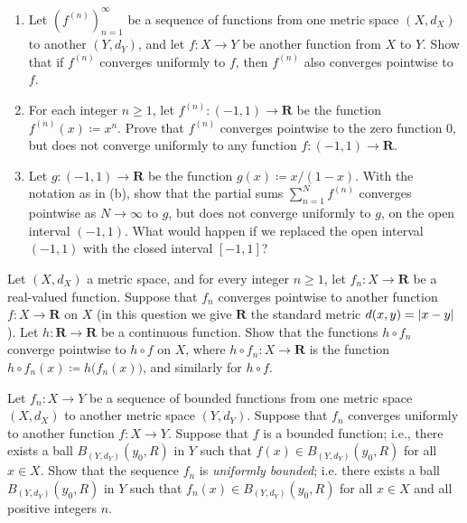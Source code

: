 \begin{exercise}\label{ex 3.2.2}
    \quad
    \begin{enumerate}
        \item Let \((f^{(n)})_{n = 1}^\infty\) be a sequence of functions from one metric space \((X, d_X)\) to another \((Y, d_Y)\), and let \(f : X \to Y\) be another function from \(X\) to \(Y\).
              Show that if \(f^{(n)}\) converges uniformly to \(f\), then \(f^{(n)}\) also converges pointwise to \(f\).
        \item For each integer \(n \geq 1\), let \(f^{(n)} : (-1, 1) \to \mathbf{R}\) be the function \(f^{(n)}(x) \coloneqq x^n\).
              Prove that \(f^{(n)}\) converges pointwise to the zero function \(0\), but does not converge uniformly to any function \(f : (-1, 1) \to \mathbf{R}\).
        \item Let \(g : (-1, 1) \to \mathbf{R}\) be the function \(g(x) \coloneqq x / (1 - x)\).
              With the notation as in (b), show that the partial sums \(\sum_{n = 1}^N f^{(n)}\) converges pointwise as \(N \to \infty\) to \(g\), but does not converge uniformly to \(g\), on the open interval \((-1, 1)\).
              What would happen if we replaced the open interval \((-1, 1)\) with the closed interval \([-1, 1]\)?
    \end{enumerate}
\end{exercise}

\begin{exercise}\label{ex 3.2.3}
    Let \((X, d_X)\) a metric space, and for every integer \(n \geq 1\), let \(f_n : X \to \mathbf{R}\) be a real-valued function.
    Suppose that \(f_n\) converges pointwise to another function \(f : X \to \mathbf{R}\) on \(X\)
    (in this question we give \(\mathbf{R}\) the standard metric \(d(x, y) = \abs*{x - y}\)).
    Let \(h : \mathbf{R} \to \mathbf{R}\) be a continuous function.
    Show that the functions \(h \circ f_n\) converge pointwise to \(h \circ f\) on \(X\), where \(h \circ f_n : X \to \mathbf{R}\) is the function \(h \circ f_n(x) \coloneqq h\big(f_n(x)\big)\), and similarly for \(h \circ f\).
\end{exercise}

\begin{exercise}\label{ex 3.2.4}
    Let \(f_n : X \to Y\) be a sequence of bounded functions from one metric space \((X, d_X)\) to another metric space \((Y, d_Y)\).
    Suppose that \(f_n\) converges uniformly to another function \(f : X \to Y\).
    Suppose that \(f\) is a bounded function;
    i.e., there exists a ball \(B_{(Y, d_Y)}(y_0, R)\) in \(Y\) such that \(f(x) \in B_{(Y, d_Y)}(y_0, R)\) for all \(x \in X\).
    Show that the sequence \(f_n\) is \emph{uniformly bounded};
    i.e. there exists a ball \(B_{(Y, d_Y)}(y_0, R)\) in \(Y\) such that \(f_n(x) \in B_{(Y, d_Y)}(y_0, R)\) for all \(x \in X\) and all positive integers \(n\).
\end{exercise}